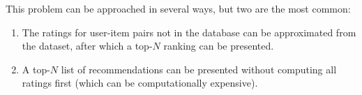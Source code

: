 This problem can be approached in several ways, but two are the most common:

\begin{enumerate}
	\item The ratings for user-item pairs not in the database can be approximated from the dataset, after which a top-$N$ ranking can be presented.
	\item A top-$N$ list of recommendations can be presented without computing all ratings first (which can be computationally expensive).
\end{enumerate}



